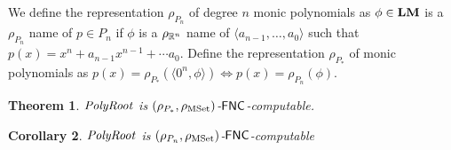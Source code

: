 \documentclass{article}
\newtheorem{theorem}{Theorem}[section]
\newtheorem{corollary}[theorem]{Corollary}
\theoremstyle{definition}
\theoremstyle{remark}
\begin{document}
We define the representation $\rho_{P_n}$ of degree $n$ monic polynomials as 
$\phi \in \mathbf{LM}$ is a $\rho_{P_n}$ name of $p \in P_n$ 
if $\phi$ is a $\rho_{\mathbb R^n}$ name of $\langle a_{n-1}, \dots, a_0 \rangle$ 
such that $p(x) = x^n + a_{n-1}x^{n-1} + \cdots a_0$.
Define the representation $\rho_{P_*}$ of monic polynomials as
$p(x) = \rho_{P_*}(\langle 0^n, \phi \rangle) \iff p(x) = \rho_{P_n}(\phi)$.


\begin{theorem}
 \label{theorem:finding-roots-is-in-NC}
 $\mathit{PolyRoot}$ is $(\rho_{P_*}, \rho_{\mathrm{MSet}})$-$\mathsf{FNC}$-computable.
\end{theorem}

\begin{corollary}
 $\mathit{PolyRoot}$ is $(\rho_{P_n}, \rho_{\mathrm{MSet}})$-$\mathsf{FNC}$-computable
\end{corollary}
\end{document}
